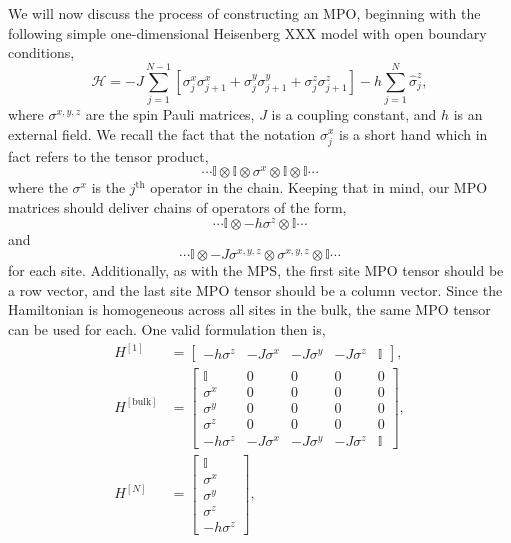  We will now discuss the process of constructing an MPO, beginning with the following simple one-dimensional Heisenberg XXX model with open boundary conditions,
 \begin{equation}
 	\mathcal {H} = -J \sum_{j=1}^{N-1} \left[ \sigma^{x}_{j}\sigma^{x}_{j+1} + \sigma^{y}_{j}\sigma^{y}_{j+1} + \sigma^{z}_{j}\sigma^{z}_{j+1} \right] - h \sum_{j=1}^{N} \hat{\sigma}^{z}_{j},
 	\label{eq:mpo1-1}
 \end{equation}
 where \(\sigma^{x,y,z}\) are the spin Pauli matrices, \(J\) is a coupling constant, and \(h\) is an external field. We recall the fact that the notation \(\sigma^{x}_{j}\) is a short hand which in fact refers to the tensor product,
 \begin{equation*}
 	\cdots \mathbb{I} \otimes \mathbb{I} \otimes \sigma^{x} \otimes \mathbb{I} \otimes \mathbb{I} \cdots
 \end{equation*}
 where the \(\sigma^{x}\) is the \(j^{\mathrm{th}}\) operator in the chain. Keeping that in mind, our MPO matrices should deliver chains of operators of the form,
 \begin{equation*}
 	\cdots \mathbb{I} \otimes -h\sigma^{z} \otimes \mathbb{I} \cdots
 \end{equation*}
 and
 \begin{equation*}
 	\cdots \mathbb{I} \otimes -J\sigma^{x,y,z} \otimes \sigma^{x,y,z} \otimes \mathbb{I} \cdots
 \end{equation*}
 for each site. Additionally, as with the MPS, the first site MPO tensor should be a row vector, and the last site MPO tensor should be a column vector. Since the Hamiltonian is homogeneous across all sites in the bulk, the same MPO tensor can be used for each. One valid formulation then is,
 \begin{align}
 	H^{[1]} &= \begin{bmatrix} -h\sigma^{z} & -J\sigma^{x} & -J\sigma^{y} & -J\sigma^{z} & \mathbb{I} \end{bmatrix}, \label{eq:mpo1-2} \\
 	H^{[\mathrm{bulk}]} &= \begin{bmatrix} \mathbb{I} & 0 & 0 & 0 & 0 \\
 										   \sigma^{x} & 0 & 0 & 0 & 0 \\
 										   \sigma^{y} & 0 & 0 & 0 & 0 \\
 										   \sigma^{z} & 0 & 0 & 0 & 0 \\
 										    -h\sigma^{z} & -J\sigma^{x} & -J\sigma^{y} & -J\sigma^{z} & \mathbb{I}
 							\end{bmatrix}, \label{eq:mpo1-3} \\
 	H^{[N]} &= \begin{bmatrix} \mathbb{I} \\ \sigma^{x} \\ \sigma^{y} \\ \sigma^{z} \\ -h\sigma^{z} \end{bmatrix}, \label{eq:mpo1-4}
 \end{align}
